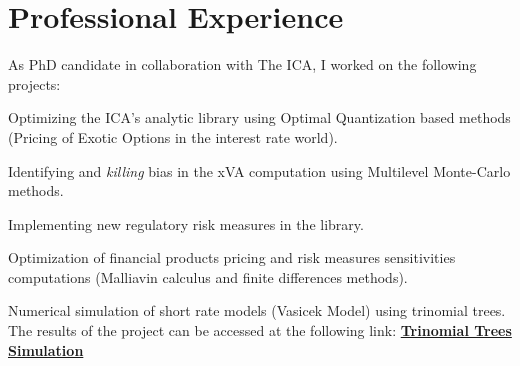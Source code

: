 \documentclass[]{deedy-resume-openfont}
\begin{document}
\begin{minipage}[t]{0.64\textwidth}
	\section{Professional Experience}

	As PhD candidate in collaboration with The ICA, I worked on the following projects:
	\begin{tightemize}
		\item Optimizing the ICA's analytic library using Optimal Quantization based methods (Pricing of Exotic Options in the interest rate world).
		\item Identifying and \textit{killing} bias in the xVA computation using Multilevel Monte-Carlo methods.
		\item Implementing new regulatory risk measures in the library.
	\end{tightemize}

	\sectionsep

	Optimization of financial products pricing and risk measures sensitivities computations (Malliavin calculus and finite differences methods).
	\sectionsep

	Numerical simulation of short rate models (Vasicek Model) using trinomial trees. The results of the project can be accessed at the following link: \href{http://simulations.lpsm.paris/trinomial_trees/}{\bf Trinomial Trees Simulation}
	\sectionsep



\end{minipage}

\nocite{*}


\end{document}
